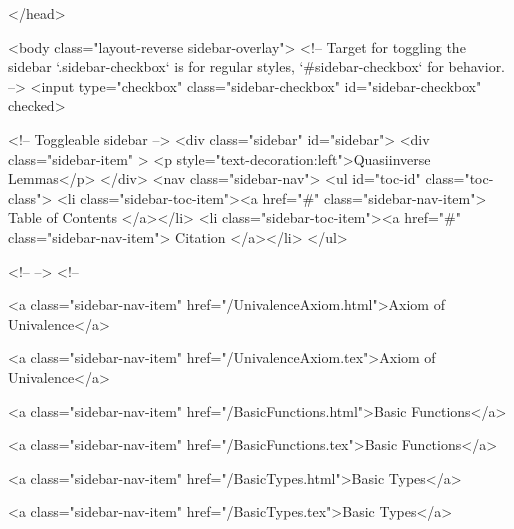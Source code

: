   
</head>




  <body class="layout-reverse sidebar-overlay">
    <!-- Target for toggling the sidebar `.sidebar-checkbox` is for regular
     styles, `#sidebar-checkbox` for behavior. -->
<input type="checkbox" class="sidebar-checkbox" id="sidebar-checkbox" checked>

<!-- Toggleable sidebar -->
<div class="sidebar" id="sidebar">
  <div class="sidebar-item" >
    <p style="text-decoration:left">Quasiinverse Lemmas</p>
  </div>
  <nav class="sidebar-nav">
    <ul id="toc-id" class="toc-class">
  <li class="sidebar-toc-item"><a href="#" class="sidebar-nav-item"> Table of Contents </a></li>
  <li class="sidebar-toc-item"><a href="#" class="sidebar-nav-item"> Citation </a></li>
</ul>


    <!--  -->
    <!-- 
      
    
      
    
      
    
      
        
      
    
      
        
          <a class="sidebar-nav-item" href="/UnivalenceAxiom.html">Axiom of Univalence</a>
        
      
    
      
        
          <a class="sidebar-nav-item" href="/UnivalenceAxiom.tex">Axiom of Univalence</a>
        
      
    
      
        
          <a class="sidebar-nav-item" href="/BasicFunctions.html">Basic Functions</a>
        
      
    
      
        
          <a class="sidebar-nav-item" href="/BasicFunctions.tex">Basic Functions</a>
        
      
    
      
        
          <a class="sidebar-nav-item" href="/BasicTypes.html">Basic Types</a>
        
      
    
      
        
          <a class="sidebar-nav-item" href="/BasicTypes.tex">Basic Types</a>
        
      
    
      
        
